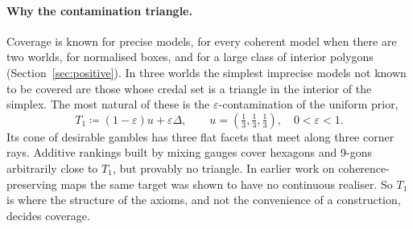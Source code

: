 \documentclass[11pt]{article}
\theoremstyle{definition}
\theoremstyle{remark}
\begin{document}
\paragraph{Why the contamination triangle.}
Coverage is known for precise models, for every coherent model when there are two worlds, for normalised boxes, and for a large class of interior polygons (Section~\ref{sec:positive}). In three worlds the simplest imprecise models not known to be covered are those whose credal set is a triangle in the interior of the simplex. The most natural of these is the $\varepsilon$-contamination of the uniform prior,
\[
T_1\coloneqq(1-\varepsilon)u+\varepsilon\Delta,\qquad u=(\tfrac13,\tfrac13,\tfrac13),\quad 0<\varepsilon<1 .
\]
Its cone of desirable gambles has three flat facets that meet along three corner rays. Additive rankings built by mixing gauges cover hexagons and 9-gons arbitrarily close to $T_1$, but provably no triangle. In earlier work on coherence-preserving maps the same target was shown to have no continuous realiser. So $T_1$ is where the structure of the axioms, and not the convenience of a construction, decides coverage.
\end{document}

